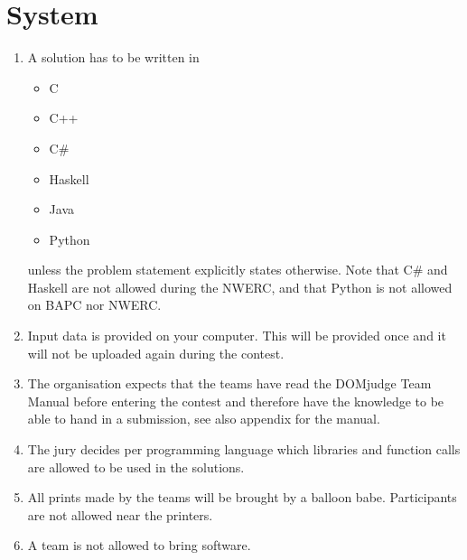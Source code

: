 \documentclass[11pt]{report}
\begin{document}
\section{System}
\begin{enumerate}[label=\bfseries 4.4.\arabic*]
\item A solution has to be written in 
\begin{itemize}
	\item C
	\item C++
	\item C\#
	\item Haskell
	\item Java
	\item Python
\end{itemize}
unless the problem statement explicitly states otherwise. Note that C\# and Haskell are not allowed during the NWERC, and that Python is not allowed on BAPC nor NWERC.
\item \label{input} Input data is provided on your computer. This will be provided once and it will not be uploaded again during the contest.
\item The organisation expects that the teams have read the DOMjudge Team Manual before entering the contest and therefore have the knowledge to be able to hand in a submission, see also appendix for the manual.
\item The jury decides per programming language which libraries and function calls are allowed to be used in the solutions.
\item All prints made by the teams will be brought by a balloon babe. Participants are not allowed near the printers.
\item \label{software}A team is not allowed to bring software.
\end{enumerate}
\end{document}
